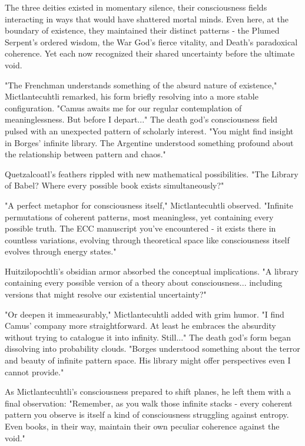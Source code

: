 The three deities existed in momentary silence, their consciousness fields interacting in ways that would have shattered mortal minds. Even here, at the boundary of existence, they maintained their distinct patterns - the Plumed Serpent's ordered wisdom, the War God's fierce vitality, and Death's paradoxical coherence. Yet each now recognized their shared uncertainty before the ultimate void.

"The Frenchman understands something of the absurd nature of existence," Mictlantecuhtli remarked, his form briefly resolving into a more stable configuration. "Camus awaits me for our regular contemplation of meaninglessness. But before I depart..." The death god's consciousness field pulsed with an unexpected pattern of scholarly interest. "You might find insight in Borges' infinite library. The Argentine understood something profound about the relationship between pattern and chaos."

Quetzalcoatl's feathers rippled with new mathematical possibilities. "The Library of Babel? Where every possible book exists simultaneously?"

"A perfect metaphor for consciousness itself," Mictlantecuhtli observed. "Infinite permutations of coherent patterns, most meaningless, yet containing every possible truth. The ECC manuscript you've encountered - it exists there in countless variations, evolving through theoretical space like consciousness itself evolves through energy states."

Huitzilopochtli's obsidian armor absorbed the conceptual implications. "A library containing every possible version of a theory about consciousness... including versions that might resolve our existential uncertainty?"

"Or deepen it immeasurably," Mictlantecuhtli added with grim humor. "I find Camus' company more straightforward. At least he embraces the absurdity without trying to catalogue it into infinity. Still..." The death god's form began dissolving into probability clouds. "Borges understood something about the terror and beauty of infinite pattern space. His library might offer perspectives even I cannot provide."

As Mictlantecuhtli's consciousness prepared to shift planes, he left them with a final observation: "Remember, as you walk those infinite stacks - every coherent pattern you observe is itself a kind of consciousness struggling against entropy. Even books, in their way, maintain their own peculiar coherence against the void."

